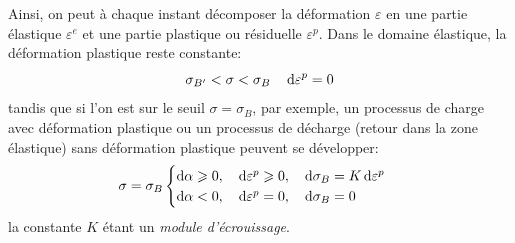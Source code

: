 Ainsi, on peut à chaque instant décomposer la déformation $\varepsilon$ en une partie élastique $\varepsilon^e$ et une partie plastique ou résiduelle $\varepsilon^p$.
Dans le domaine élastique, la déformation plastique reste constante: 
\begin{equation}
    \sigma_{B'} < \sigma <\sigma_B \quad \mathop{\mathrm{{}d}}\mathopen{} \varepsilon^p = 0
    \label{eq:Ch10-003}
\end{equation}
tandis que si l'on est sur le seuil $\sigma = \sigma_B$, par exemple, un processus de charge avec déformation plastique ou un processus de décharge (retour dans la zone élastique) sans déformation plastique peuvent se développer: 
\begin{equation}
    \sigma = \sigma_B 
    \begin{cases}
        \mathop{\mathrm{{}d}}\mathopen{} \alpha \geqslant 0, \quad \mathop{\mathrm{{}d}}\mathopen{} \varepsilon^p \geqslant 0, \quad \mathop{\mathrm{{}d}}\mathopen{} \sigma_B = K \mathop{\mathrm{{}d}}\mathopen{} \varepsilon^p \\
        \mathop{\mathrm{{}d}}\mathopen{} \alpha < 0, \quad \mathop{\mathrm{{}d}}\mathopen{} \varepsilon^p = 0, \quad \mathop{\mathrm{{}d}}\mathopen{} \sigma_B = 0
    \end{cases}
    \label{eq:Ch10-004}
\end{equation}
la constante $K$ étant un \emph{module d'écrouissage}.

